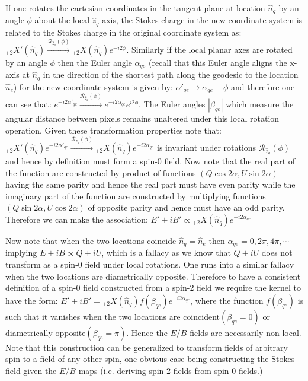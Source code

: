 If one rotates the cartesian coordinates in the tangent plane at location $\hat{n}_q$ by an angle $\phi$ about the local $\hat{z}_q$ axis, the Stokes charge in the new coordinate system is related to the Stokes charge in the original coordinate system as: ${}_{+2}X'(\hat{n}_q) \xrightarrow{\mathcal{R}_{\hat{z}_q}(\phi)} {}_{+2}X(\hat{n}_q) e^{-i2\phi} $. Similarly if the local planar axes are rotated by an angle $\phi$ then the Euler angle $\alpha_{qe}$ (recall that this Euler angle aligns the x-axis at $\hat{n}_q$ in the direction of the shortest path along the geodesic to the location $\hat{n}_e$) for the new coordinate system is given by: $\alpha'_{qe} \rightarrow \alpha_{qe} - \phi$ and therefore one can see that: $e^{-i2\alpha'_{qe}} \xrightarrow{\mathcal{R}_{\hat{z}_q}(\phi)} e^{-i2\alpha_{qe}} e^{i2\phi}$. The Euler angles $|\beta_{qe}|$ which measure the angular distance between pixels remains unaltered under this local rotation operation.  Given these transformation properties note that: ${}_{+2}X'(\hat{n}_q)e^{-i2\alpha'_{qe}} \xrightarrow{\mathcal{R}_{\hat{z}_q}(\phi)} {}_{+2}X(\hat{n}_q) e^{-i2\alpha_{qe}}$ is invariant under rotations  $\mathcal{R}_{\hat{z}_q}(\phi)$ and hence by definition must form a spin-0 field.  Now note that the real part of the function are constructed by product of functions $(Q\cos{2\alpha}, U\sin{2 \alpha})$ having the same parity and hence the real part must have even parity while the imaginary part of the function are constructed by multiplying functions $(Q\sin{2 \alpha}, U\cos{2\alpha})$ of opposite parity and hence must have an odd parity. Therefore we can make the association: $E'+iB' \propto {}_{+2}X(\hat{n}_q) e^{-i2\alpha_{qe}}$

Now note that when the two locations coincide $\hat{n}_q = \hat{n}_e$ then  $\alpha_{qe}=0,2\pi,4\pi,\cdots$ implying $E + iB \propto Q+iU$, which is a fallacy as we know that $Q+iU$ does not transform as a spin-0 field under local rotations. One runs into a similar fallacy when the two locations are diametrically opposite.  Therefore to have a consistent definition of a spin-0 field constructed from a spin-2 field we require the kernel to have the form: $E'+iB' = {}_{+2}X(\hat{n}_q) f(\beta_{qe})  e^{-i2\alpha_{qe}}$, where the function $f(\beta_{qe})$ is such that it vanishes when the two locations are coincident$(\beta_{qe}=0)$ or diametrically opposite$(\beta_{qe}=\pi)$. Hence the $E/B$ fields are necessarily non-local. Note that this construction can be generalized to transform fields of arbitrary spin to a field of any other spin, one obvious case being constructing the Stokes field given the $E/B$ maps (i.e. deriving spin-2 fields from spin-0 fields.)

